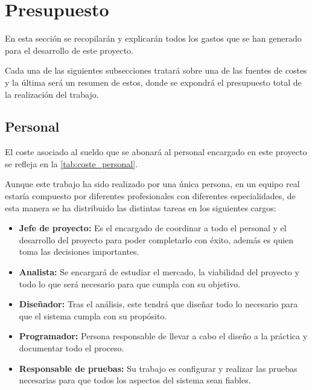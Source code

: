 \section{Presupuesto}\label{sec:presupuesto}
En esta sección se recopilarán y explicarán todos los gastos que se han generado para el desarrollo de este proyecto.

Cada una de las siguientes subsecciones tratará sobre una de las fuentes de costes y la última será un resumen de estos, donde se expondrá el presupuesto total de la realización del trabajo.

\subsection{Personal}\label{subsec:personal}
El coste asociado al sueldo que se abonará al personal encargado en este proyecto se refleja en la \autoref{tab:coste_personal}.

Aunque este trabajo ha sido realizado por una única persona, en un equipo real estaría compuesto por diferentes profesionales con diferentes especialidades, de esta manera se ha distribuido las distintas tareas en los siguientes cargos:
\begin{itemize}
	\item \textbf{Jefe de proyecto:} Es el encargado de coordinar a todo el personal y el desarrollo del proyecto para poder completarlo con éxito, además es quien toma las decisiones importantes.
	\item \textbf{Analista:} Se encargará de estudiar el mercado, la viabilidad del proyecto y todo lo que será necesario para que cumpla con su objetivo.
	\item \textbf{Diseñador:} Tras el análisis, este tendrá que diseñar todo lo necesario para que el sistema cumpla con su propósito.
	\item \textbf{Programador:} Persona responsable de llevar a cabo el diseño a la práctica y documentar todo el proceso.
	\item \textbf{Responsable de pruebas:} Su trabajo es configurar y realizar las pruebas necesarias para que todos los aspectos del sistema sean fiables.
\end{itemize}

